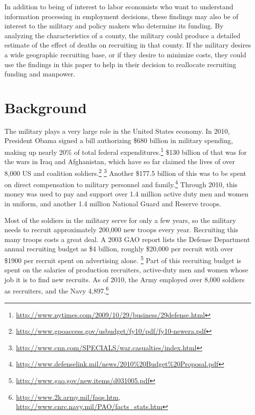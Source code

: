 \documentclass[12pt] {article}
\begin{document}
In addition to being of interest to labor economists who want to understand information processing in employment decisions, these findings may also be of interest to the military and policy makers who determine its funding. By analyzing the characteristics
of a county, the military could produce a detailed estimate of the
effect of deaths on recruiting in that county. If the military desires
a wide geographic recruiting base, or if they desire to minimize costs,
they could use the findings in this paper to help in their decision
to reallocate recruiting funding and manpower. 


\section{Background\label{sec:Literature-Review}}
The military plays a very large role in the United States economy.
In 2010, President Obama signed a bill authorizing \$680 billion in
military spending, making up nearly 20\% of total federal expenditures.\footnote{\url{http://www.nytimes.com/2009/10/29/business/29defense.html}} \$130 billion of that was for the wars in Iraq and Afghanistan, which have so far claimed the lives of over 8,000 US and coalition
soldiers.\footnote{\url{http://www.gpoaccess.gov/usbudget/fy10/pdf/fy10-newera.pdf}}
\footnote{\url{http://www.cnn.com/SPECIALS/war.casualties/index.html}
} Another \$177.5 billion of this was to be spent on direct compensation
to military personnel and family.\footnote{\url{http://www.defenselink.mil/news/2010\%20Budget\%20Proposal.pdf}} Through 2010, this money was used to pay and support over
1.4 million active duty men and women in uniform, and another 1.4
million National Guard and Reserve troops. 

Most of the soldiers in the military serve for only a few years, so the military needs
to recruit approximately 200,000 new troops every year. Recruiting this many troops costs a great deal. A 2003 GAO report lists the Defense Department annual recruiting budget as \$4
billion, roughly \$20,000 per recruit with over \$1900 per recruit
spent on advertising alone.%
\footnote{\url{http://www.gao.gov/new.items/d031005.pdf}
} Part of this recruiting budget is spent on the salaries of production
recruiters, active-duty men and women whose job it is to find new
recruits. As of 2010, the Army employed over 8,000 soldiers as recruiters,
and the Navy 4,897.\footnote{\url{http://www.2k.army.mil/faqs.htm}, \url{http://www.cnrc.navy.mil/PAO/facts\_stats.htm}
} 
\end{document}

